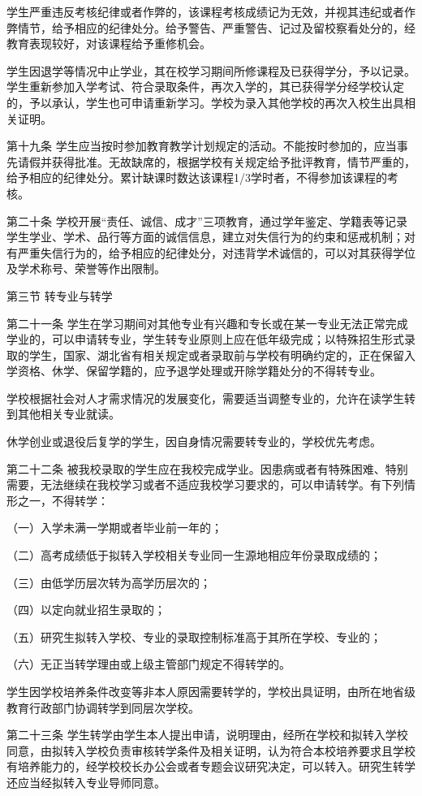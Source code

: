 \documentclass[UTF8,12pt,a4paper]{report}
\begin{document}
学生严重违反考核纪律或者作弊的，该课程考核成绩记为无效，并视其违纪或者作弊情节，给予相应的纪律处分。给予警告、严重警告、记过及留校察看处分的，经教育表现较好，对该课程给予重修机会。

学生因退学等情况中止学业，其在校学习期间所修课程及已获得学分，予以记录。学生重新参加入学考试、符合录取条件，再次入学的，其已获得学分经学校认定的，予以承认，学生也可申请重新学习。学校为录入其他学校的再次入校生出具相关证明。

第十九条 学生应当按时参加教育教学计划规定的活动。不能按时参加的，应当事先请假并获得批准。无故缺席的，根据学校有关规定给予批评教育，情节严重的，给予相应的纪律处分。累计缺课时数达该课程1/3学时者，不得参加该课程的考核。

第二十条 学校开展“责任、诚信、成才”三项教育，通过学年鉴定、学籍表等记录学生学业、学术、品行等方面的诚信信息，建立对失信行为的约束和惩戒机制；对有严重失信行为的，给予相应的纪律处分，对违背学术诚信的，可以对其获得学位及学术称号、荣誉等作出限制。

第三节 转专业与转学

第二十一条 学生在学习期间对其他专业有兴趣和专长或在某一专业无法正常完成学业的，可以申请转专业，学生转专业原则上应在低年级完成；以特殊招生形式录取的学生，国家、湖北省有相关规定或者录取前与学校有明确约定的，正在保留入学资格、休学、保留学籍的，应予退学处理或开除学籍处分的不得转专业。

学校根据社会对人才需求情况的发展变化，需要适当调整专业的，允许在读学生转到其他相关专业就读。

休学创业或退役后复学的学生，因自身情况需要转专业的，学校优先考虑。

第二十二条 被我校录取的学生应在我校完成学业。因患病或者有特殊困难、特别需要，无法继续在我校学习或者不适应我校学习要求的，可以申请转学。有下列情形之一，不得转学：

（一）入学未满一学期或者毕业前一年的；

（二）高考成绩低于拟转入学校相关专业同一生源地相应年份录取成绩的；

（三）由低学历层次转为高学历层次的；

（四）以定向就业招生录取的；

（五）研究生拟转入学校、专业的录取控制标准高于其所在学校、专业的；

（六）无正当转学理由或上级主管部门规定不得转学的。

学生因学校培养条件改变等非本人原因需要转学的，学校出具证明，由所在地省级教育行政部门协调转学到同层次学校。

第二十三条 学生转学由学生本人提出申请，说明理由，经所在学校和拟转入学校同意，由拟转入学校负责审核转学条件及相关证明，认为符合本校培养要求且学校有培养能力的，经学校校长办公会或者专题会议研究决定，可以转入。研究生转学还应当经拟转入专业导师同意。
\end{document}
